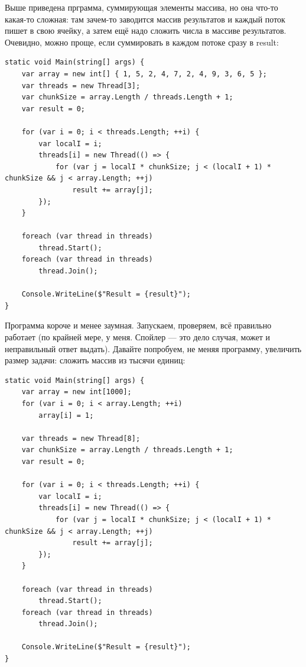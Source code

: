 \documentclass[a5paper]{article}
\begin{document}
Выше приведена прграмма, суммирующая элементы массива, но она что-то какая-то сложная: там зачем-то заводится массив результатов и каждый поток пишет в свою ячейку, а затем ещё надо сложить числа в массиве результатов. Очевидно, можно проще, если суммировать в каждом потоке сразу в result:

\begin{small}
    \begin{verbatim}
static void Main(string[] args) {
    var array = new int[] { 1, 5, 2, 4, 7, 2, 4, 9, 3, 6, 5 };
    var threads = new Thread[3];
    var chunkSize = array.Length / threads.Length + 1;
    var result = 0;

    for (var i = 0; i < threads.Length; ++i) {
        var localI = i;
        threads[i] = new Thread(() => {
            for (var j = localI * chunkSize; j < (localI + 1) * chunkSize && j < array.Length; ++j)
                result += array[j];
        });
    }

    foreach (var thread in threads)
        thread.Start();
    foreach (var thread in threads)
        thread.Join();

    Console.WriteLine($"Result = {result}");
}
    \end{verbatim}
\end{small}

Программа короче и менее заумная. Запускаем, проверяем, всё правильно работает (по крайней мере, у меня. Спойлер --- это дело случая, может и неправильный ответ выдать). Давайте попробуем, не меняя программу, увеличить размер задачи: сложить массив из тысячи единиц:

\begin{small}
    \begin{verbatim}
static void Main(string[] args) {
    var array = new int[1000];
    for (var i = 0; i < array.Length; ++i)
        array[i] = 1;

    var threads = new Thread[8];
    var chunkSize = array.Length / threads.Length + 1;
    var result = 0;

    for (var i = 0; i < threads.Length; ++i) {
        var localI = i;
        threads[i] = new Thread(() => {
            for (var j = localI * chunkSize; j < (localI + 1) * chunkSize && j < array.Length; ++j)
                result += array[j];
        });
    }

    foreach (var thread in threads)
        thread.Start();
    foreach (var thread in threads)
        thread.Join();

    Console.WriteLine($"Result = {result}");
}
    \end{verbatim}
\end{small}
\end{document}
